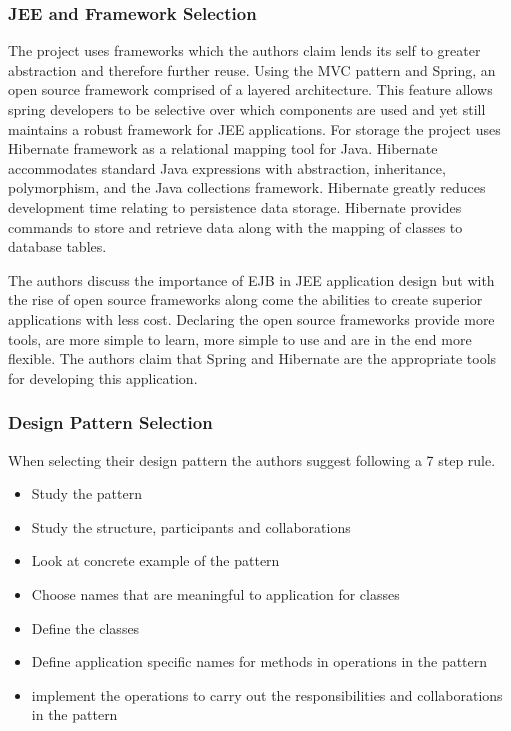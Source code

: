 \documentclass{article}
\begin{document}
		\subsubsection{JEE and Framework Selection}
		The project uses frameworks which the authors claim lends its self to greater abstraction and therefore further reuse. Using the MVC\cite{MVC} pattern and Spring, an open source framework comprised of a layered architecture. This feature allows spring developers to be selective over which components are used and yet still maintains a robust framework for JEE applications. For storage the project uses Hibernate framework as a relational mapping tool for Java. Hibernate accommodates standard Java expressions with abstraction, inheritance, polymorphism, and the Java collections framework. Hibernate greatly reduces development time relating to persistence data storage. Hibernate provides commands to store and retrieve data along with the mapping of classes to database tables.
		
		The authors discuss the importance of EJB in JEE application design but with the rise of open source frameworks along come the abilities to create superior applications with less cost. Declaring the open source frameworks provide more tools, are more simple to learn, more simple to use and are in the end more flexible. The authors claim that Spring and Hibernate are the appropriate tools for developing this application.

		\subsubsection{Design Pattern Selection}
		When selecting their design pattern the authors suggest following a 7 step rule.
			\begin{itemize}
				\item Study the pattern
				\item Study the structure, participants  and collaborations 
				\item Look at concrete example of the pattern
				\item Choose names that are meaningful to application for classes
				\item Define the classes
				\item Define application specific names for methods in operations in the pattern
				\item implement the operations to carry out the responsibilities and collaborations in the pattern
			\end{itemize}
\end{document}
